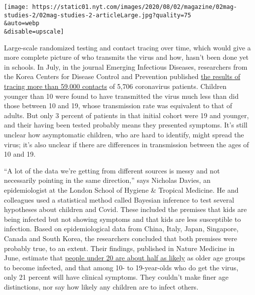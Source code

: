 \texttt{[image: https://static01.nyt.com/images/2020/08/02/magazine/02mag-studies-2/02mag-studies-2-articleLarge.jpg?quality=75\\\&auto=webp\\\&disable=upscale]}

Large-scale randomized testing and contact tracing over time, which
would give a more complete picture of who transmits the virus and how,
hasn't been done yet in schools. In July, in the journal Emerging
Infectious Diseases, researchers from the Korea Centers for Disease
Control and Prevention published
\href{https://wwwnc.cdc.gov/eid/article/26/10/20-1315_article}{the
results of tracing more than 59,000 contacts} of 5,706 coronavirus
patients. Children younger than 10 were found to have transmitted the
virus much less than did those between 10 and 19, whose transmission
rate was equivalent to that of adults. But only 3 percent of patients in
that initial cohort were 19 and younger, and their having been tested
probably means they presented symptoms. It's still unclear how
asymptomatic children, who are hard to identify, might spread the virus;
it's also unclear if there are differences in transmission between the
ages of 10 and 19.

``A lot of the data we're getting from different sources is messy and
not necessarily pointing in the same direction,'' says Nicholas Davies,
an epidemiologist at the London School of Hygiene \& Tropical Medicine.
He and colleagues used a statistical method called Bayesian inference to
test several hypotheses about children and Covid. These included the
premises that kids are being infected but not showing symptoms and that
kids are less susceptible to infection. Based on epidemiological data
from China, Italy, Japan, Singapore, Canada and South Korea, the
researchers concluded that both premises were probably true, to an
extent. Their findings, published in Nature Medicine in June, estimate
that \href{https://www.nature.com/articles/s41591-020-0962-9}{people
under 20 are about half as likely} as older age groups to become
infected, and that among 10- to 19-year-olds who do get the virus, only
21 percent will have clinical symptoms. They couldn't make finer age
distinctions, nor say how likely any children are to infect others.

